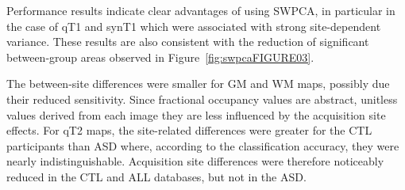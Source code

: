 Performance results indicate clear advantages of using SWPCA, in
particular in the case of \ac{qT1} and \ac{synT1} which were associated with
strong site-dependent variance. These results are also consistent with
the reduction of significant between-group areas observed in Figure~\ref{fig:swpcaFIGURE03}.
	
The between-site differences were smaller for \ac{GM} and \ac{WM} maps, possibly
due their reduced sensitivity. Since fractional occupancy values are
abstract, unitless values derived from each image they are less
influenced by the acquisition site effects. For \ac{qT2} maps, the
site-related differences were greater for the CTL participants than ASD
where, according to the classification accuracy, they were nearly
indistinguishable. Acquisition site differences were therefore
noticeably reduced in the CTL and ALL databases, but not in the ASD.

